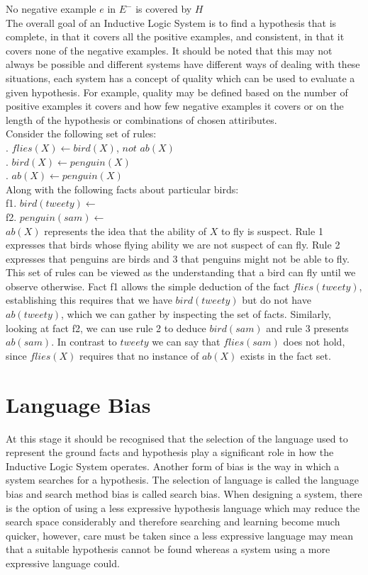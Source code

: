 \documentclass{article}
\begin{document}
\indent No negative example $e$ in $E^-$ is covered by $H$\\[5pt]
The overall goal of an Inductive Logic System is to find a hypothesis that is
complete, in that it covers all the positive examples, and consistent, in that
it covers none of the negative examples. It should be noted that this may not
always be possible and different systems have different ways of dealing with
these situations, each system has a concept of quality which can be used to
evaluate a given hypothesis. For example, quality may be defined based on the
number of positive examples it covers and how few negative examples it covers
or on the length of the hypothesis or combinations of chosen
attiributes.\\[5pt]
Consider the following set of rules: \\[5pt]
. $flies(X) \leftarrow bird(X)$, $not$ $ab(X)$ \\ 
. $bird(X) \leftarrow penguin(X)$ \\ 
. $ab(X) \leftarrow penguin(X)$ \\[5pt]
Along with the following facts about particular birds:\\[5pt]
\indent f1. $bird(tweety) \leftarrow$ \\
\indent f2. $penguin(sam) \leftarrow$ \\[5pt]
$ab(X)$ represents the idea that the ability of $X$ to fly is suspect. Rule 1
expresses that birds whose flying ability we are not suspect of can fly. Rule 2
expresses that penguins are birds and 3 that penguins might not be able to fly.
This set of rules can be viewed as the understanding that a bird can fly until
we observe otherwise. Fact f1 allows the simple deduction of the fact
$flies(tweety)$, establishing this requires that we have $bird(tweety)$ but do
not have $ab(tweety)$, which we can gather by inspecting the set of facts.
Similarly, looking at fact f2, we can use rule 2 to deduce $bird(sam)$ and rule 
3 presents $ab(sam)$. In contrast to $tweety$ we can say that $flies(sam)$ does
not hold, since $flies(X)$ requires that no instance of $ab(X)$ exists in the
fact set.

\section{Language Bias}

At this stage it should be recognised that the selection of the language used
to represent the ground facts and hypothesis play a significant role in how the
Inductive Logic System operates. Another form of bias is the way in which a
system searches for a hypothesis. The selection of language is called the
language bias and search method bias is called search bias.
When designing a system, there is the option of using a less expressive
hypothesis language which may reduce the search space considerably and
therefore searching and learning become much quicker, however, care must be
taken since a less expressive language may mean that a suitable hypothesis
cannot be found whereas a system using a more expressive language could.
\end{document}
